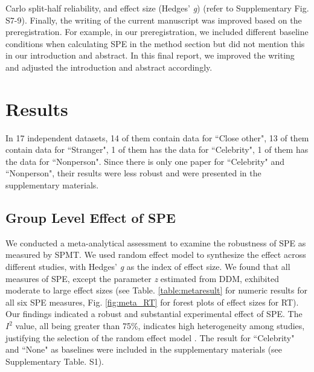 \documentclass[sn-apa]{sn-jnl}%
\theoremstyle{thmstyleone}%
\theoremstyle{thmstyletwo}%
\theoremstyle{thmstylethree}%
\begin{document}
Carlo split-half reliability, and effect size (Hedges’ \textit{g}) (refer to Supplementary Fig. S7-9). Finally, the writing of the current manuscript was improved based on the preregistration. For example, in our preregistration, we included different baseline conditions when calculating SPE in the method section but did not mention this in our introduction and abstract. In this final report, we improved the writing and adjusted the introduction and abstract accordingly. 

\section{Results}\label{sec4}

In 17 independent datasets, 14 of them contain data for ``Close other", 13 of them contain data for ``Stranger", 1 of them has the data for ``Celebrity", 1 of them has the data for ``Nonperson". Since there is only one paper for ``Celebrity" and ``Nonperson", their results were less robust and were presented in the supplementary materials.

\subsection{Group Level Effect of SPE}\label{subsec:groupeff}

We conducted a meta-analytical assessment to examine the robustness of SPE as measured by SPMT. We used random effect model to synthesize the effect across different studies, with Hedges’ \textit{g} as the index of effect size. We found that all measures of SPE, except the parameter \textit{z} estimated from DDM, exhibited moderate to large effect sizes (see Table. \ref{table:metaresult} for numeric results for all six SPE measures, Fig. \ref{fig:meta_RT} for forest plots of effect sizes for RT). Our findings indicated a robust and substantial experimental effect of SPE. The $I^{2}$ value, all being greater than 75\%, indicates high heterogeneity among studies, justifying the selection of the random effect model \parencite{borenstein2021introduction}.  The result for ``Celebrity" and ``None" as baselines were included in the supplementary materials (see Supplementary Table. S1). 
\end{document}
